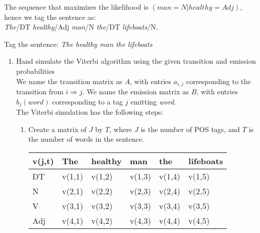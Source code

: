 \documentclass[12pt]{article}
\newenvironment{exercise}[2][Exercise]{\begin{trivlist}
\item[\hskip \labelsep {\bfseries #1}\hskip \labelsep {\bfseries #2.}]}{\end{trivlist}}
\begin{document}
\begin{exercise}{4. Bigram tagging}
\begin{enumerate}[label=(\alph*)]
\begin{itemize}
	The sequence that maximizes the likelihood is $(man = N | healthy = Adj)$, hence we tag the sentence as: \\
	
	\textit{The}/DT \textit{healthy}/Adj \textit{man}/N \textit{the}/DT \textit{lifeboats}/N.\\
	
	\end{itemize}


\end{enumerate}
\end{exercise}
 
\begin{exercise}{5. Viterbi} Tag the sentence: \textit{The healthy man the lifeboats}
	
\begin{enumerate}[label=(\alph*)]

\item Hand simulate the Viterbi algorithm using the given transition and emission probabilities \\ 

	We name the transition matrix as $A$, with entries $a_{i,j}$ corresponding to the transition from $i \Rightarrow j$. We name the emission matrix as $B$, with entries $b_j(\textit{word})$ corresponding to a tag $j$ emitting \textit{word}. \\
	
	The Viterbi simulation has the following steps:

\begin{enumerate}[label=\arabic*)]
	\item Create a matrix of $J$ by $T$, where $J$ is the number of POS tags, and $T$ is the number of words in the sentence. 
	
	\begin{table}[H]
	\centering
	\begin{tabular}{|l|l|l|l|l|l|}
	\hline
	v(j,t) & The    & healthy & man    & the    & lifeboats \\ \hline
	DT     & v(1,1) & v(1,2)  & v(1,3) & v(1,4) & v(1,5)    \\ \hline
	N      & v(2,1) & v(2,2)  & v(2,3) & v(2,4) & v(2,5)    \\ \hline
	V      & v(3,1) & v(3,2)  & v(3,3) & v(3,4) & v(3,5)    \\ \hline
	Adj    & v(4,1) & v(4,2)  & v(4,3) & v(4,4) & v(4,5)    \\ \hline
	\end{tabular}
	\end{table}


\end{enumerate}
\end{enumerate}
\end{exercise}
\end{document}
